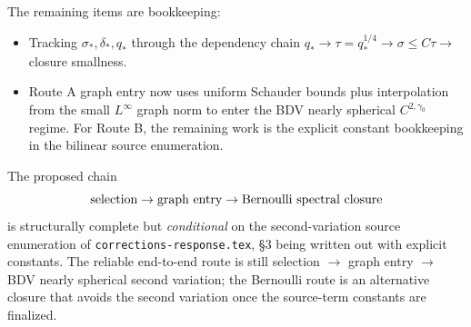 \documentclass[11pt]{article}
\theoremstyle{definition}
\begin{document}
The remaining items are bookkeeping:
\begin{itemize}
\item Tracking $\sigma_*,\delta_*,q_*$ through the dependency chain
$q_*\to\tau=q_*^{1/4}\to\sigma\le C\tau\to$ closure smallness.
\item Route A graph entry now uses uniform Schauder bounds plus interpolation
from the small \(L^\infty\) graph norm to enter the BDV nearly spherical
\(C^{2,\gamma_0}\) regime. For Route B, the remaining work is the explicit
constant bookkeeping in the bilinear source enumeration.
\end{itemize}

The proposed chain
\[
\hbox{selection}\to\hbox{graph entry}\to\hbox{Bernoulli spectral closure}
\]
is structurally complete but \emph{conditional} on the second-variation
source enumeration of \texttt{corrections-response.tex}, \S 3 being written
out with explicit constants. The reliable end-to-end route is still
selection $\to$ graph entry $\to$ BDV nearly spherical second variation; the
Bernoulli route is an alternative closure that avoids the second variation
once the source-term constants are finalized.
\end{document}
